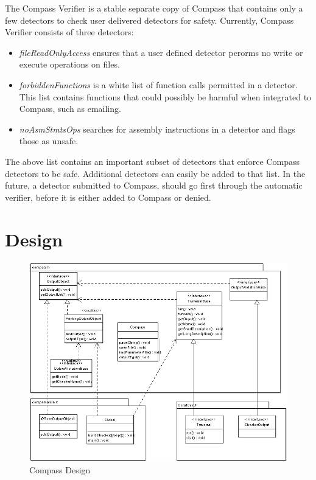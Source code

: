 The Compass Verifier is a stable separate copy of Compass that contains only a few detectors
to check user delivered detectors for safety. Currently, Compass Verifier consists of three
detectors:

\begin{itemize}
\item \emph{fileReadOnlyAccess} ensures that a user defined detector perorms no write or execute operations on files. 
\item \emph{forbiddenFunctions} is a white list of function calls permitted in a detector. This list contains functions
that could possibly be harmful when integrated to Compass, such as emailing.
\item \emph{noAsmStmtsOps} searches for assembly instructions in a detector and flags those as unsafe.
\end{itemize}

The above list contains an important subset of detectors that enforce Compass detectors to be safe. 
Additional detectors can easily be added to that list.
In the future, a detector submitted to Compass, should go first through the automatic verifier, before it is either 
added to Compass or denied.  


\section{Design}

\begin{figure}[thb]
\includegraphics[width=6.0in]{compassdesign.png}
\caption{Compass Design}
\label{CompassDesign}
\end{figure}

